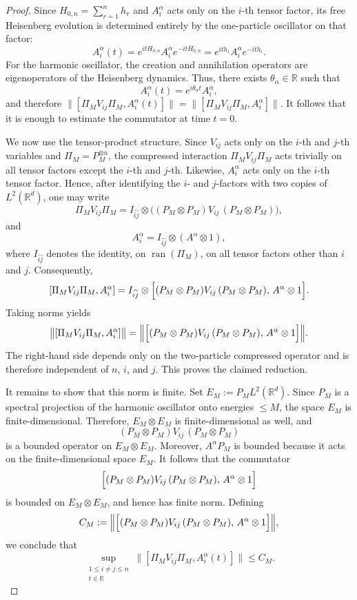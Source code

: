 \documentclass[11pt]{amsart}
\newcommand{\1}{\mathbbm{1}}
\theoremstyle{plain}
\theoremstyle{definition}
\theoremstyle{remark}
\numberwithin{equation}{section}
\begin{document}
\begin{proof}
Since \(H_{0,n}=\sum_{r=1}^n h_r\) and \(A_i^\alpha\) acts only on the \(i\)-th tensor factor, its free Heisenberg evolution is determined entirely by the one-particle oscillator on that factor:
\[
A_i^\alpha(t)=e^{itH_{0,n}}A_i^\alpha e^{-itH_{0,n}}=e^{ith_i}A_i^\alpha e^{-ith_i}.
\]
For the harmonic oscillator, the creation and annihilation operators are eigenoperators of the Heisenberg dynamics. Thus, there exists \(\theta_\alpha\in\mathbb R\) such that
\[
A_i^\alpha(t)=e^{i\theta_\alpha t}A_i^\alpha,
\]
and therefore $\bigl\|[\Pi_MV_{ij}\Pi_M,A_i^\alpha(t)]\bigr\|
=
\bigl\|[\Pi_MV_{ij}\Pi_M,A_i^\alpha]\bigr\|.$
It follows that it is enough to estimate the commutator at time \(t=0\).

We now use the tensor-product structure. Since \(V_{ij}\) acts only on the \(i\)-th and \(j\)-th variables and \(\Pi_M=P_M^{\otimes n}\), the compressed interaction \(\Pi_MV_{ij}\Pi_M\) acts trivially on all tensor factors except the \(i\)-th and \(j\)-th. Likewise, \(A_i^\alpha\) acts only on the \(i\)-th tensor factor. Hence, after identifying the \(i\)- and \(j\)-factors with two copies of \(L^2(\mathbb R^d)\), one may write
\[
\Pi_MV_{ij}\Pi_M
=
I_{\widehat{ij}}\otimes
\bigl((P_M\otimes P_M)V_{ij}\,(P_M\otimes P_M)\bigr),
\]
and
\[
A_i^\alpha
=
I_{\widehat{ij}}\otimes (A^\alpha\otimes 1),
\]
where \(I_{\widehat{ij}}\) denotes the identity, on $\operatorname{ran}(\Pi_M)$, on all tensor factors other than \(i\) and \(j\). Consequently,
\[
[\Pi_MV_{ij}\Pi_M,A_i^\alpha]
=
I_{\widehat{ij}}\otimes
\Bigl[(P_M\otimes P_M)V_{ij}\,(P_M\otimes P_M),\,A^\alpha\otimes 1\Bigr].
\]
Taking norms yields
\[
\bigl\|[\Pi_MV_{ij}\Pi_M,A_i^\alpha]\bigr\|
=
\Bigl\|
\Bigl[(P_M\otimes P_M)V_{ij}\,(P_M\otimes P_M),\,A^\alpha\otimes 1\Bigr]
\Bigr\|.
\]
The right-hand side depends only on the two-particle compressed operator and is therefore independent of \(n\), \(i\), and \(j\). This proves the claimed reduction.

It remains to show that this norm is finite. Set $E_M:=P_ML^2(\mathbb R^d).$
Since \(P_M\) is a spectral projection of the harmonic oscillator onto energies \(\le M\), the space \(E_M\) is finite-dimensional. Therefore, \(E_M\otimes E_M\) is finite-dimensional as well, and
\[
(P_M\otimes P_M)V_{ij}\,(P_M\otimes P_M)
\]
is a bounded operator on \(E_M\otimes E_M\). Moreover, \(A^\alpha P_M\) is bounded because it acts on the finite-dimensional space \(E_M\). It follows that the commutator
\[
\Bigl[(P_M\otimes P_M)V_{ij}\,(P_M\otimes P_M),\,A^\alpha\otimes 1\Bigr]
\]
is bounded on \(E_M\otimes E_M\), and hence has finite norm. Defining
\[
C_M:=
\Bigl\|
\Bigl[(P_M\otimes P_M)V_{ij}\,(P_M\otimes P_M),\,A^\alpha\otimes 1\Bigr]
\Bigr\|,
\]
we conclude that
\[
\sup_{\substack{1\le i\neq j\le n\\ t\in\mathbb R}}
\bigl\|[\Pi_MV_{ij}\Pi_M,A_i^\alpha(t)]\bigr\|
\le C_M.
\]


\end{proof}
\end{document}
